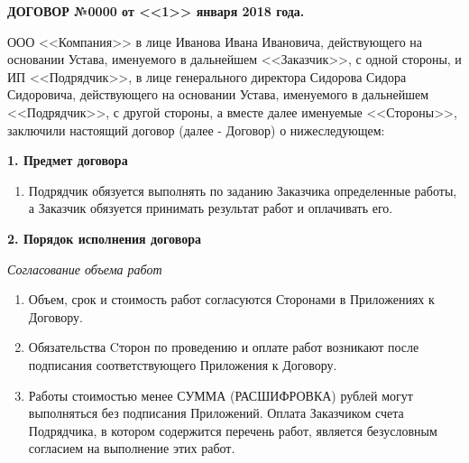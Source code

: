 \documentclass[a4paper, fontsize=12bp]{article}
\newcounter{enum}
\begin{document}
\begin{center}

\textbf{ДОГОВОР №0000 от <<1>> января 2018 года.}
\end{center}

ООО <<Компания>> в лице Иванова Ивана Ивановича, действующего на основании Устава, именуемого в дальнейшем <<Заказчик>>, с одной стороны, и ИП <<Подрядчик>>, в лице генерального директора Сидорова Сидора Сидоровича, действующего на основании Устава, именуемого в дальнейшем <<Подрядчик>>, с другой стороны, а вместе далее именуемые <<Стороны>>, заключили настоящий договор (далее - Договор) о нижеследующем:


\begin{center}
\textbf{1. Предмет договора}
\end{center}

\begin{enumerate}[label=\arabic{enum}.\arabic*]
\item Подрядчик обязуется выполнять по заданию Заказчика определенные работы, а Заказчик обязуется принимать результат работ и оплачивать его.
\end{enumerate}


\begin{center}
\textbf{2. Порядок исполнения договора}
\end{center}

\noindent
\textit{Согласование объема работ}
\begin{enumerate}[label=\arabic{enum}.\arabic*.]
\item Объем, срок и стоимость работ согласуются Сторонами в Приложениях к Договору.

\item Обязательства Cторон по проведению и оплате работ возникают после подписания соответствующего Приложения к Договору.

\item Работы стоимостью менее СУММА (РАСШИФРОВКА) рублей могут выполняться без подписания Приложений. Оплата Заказчиком счета Подрядчика, в котором содержится перечень работ, является безусловным согласием на выполнение этих работ.
\end{enumerate}
\end{document}

